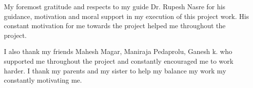 \acknowledgements
My foremost gratitude and respects to my guide Dr. Rupesh Nasre for his guidance, motivation and moral support in my execution of this project work. His constant motivation for me towards the project helped me throughout the project.

I also thank my friends Mahesh Magar, Maniraja Pedaprolu, Ganesh k. who supported me throughout the project and constantly encouraged me to work harder. I thank my parents and my sister to help my balance my work my constantly motivating me.
